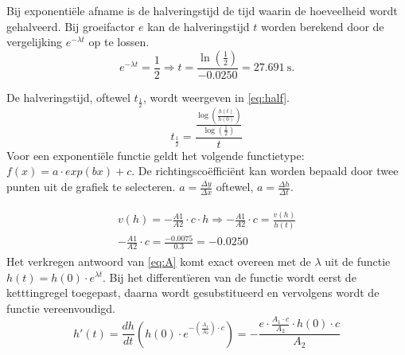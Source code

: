 \documentclass{scrartcl}
\begin{document}
Bij exponentiële afname is de halveringstijd de tijd waarin de hoeveelheid wordt gehalveerd. Bij groeifactor $e$ kan de halveringstijd $t$ worden berekend door de vergelijking $e^{-\lambda t}$ op te lossen.
\begin{equation}
e^{-\lambda t} = \frac{1}{2} \Rightarrow t =\frac{\ln(\frac{1}{2})}{-0.0250} = \SI{27.691}{\second}.
\end{equation}



De halveringstijd, oftewel $t_{\frac{1}{2}}$, wordt weergeven in \ref{eq:half}.
\begin{equation}\label{eq:half}
 t_{\frac{1}{2}}=\frac{\frac{\log\left(\frac{h(t)}{h(0)}\right)}{\log(\frac{1}{2})}}{t}
\end{equation}
Voor een exponentiële functie geldt het volgende functietype: $f(x) = a \cdot exp(bx)+c$. De richtingscoëfficiënt kan worden bepaald door twee punten uit de grafiek te selecteren. $a=\frac{\Delta y}{\Delta x}$ oftewel, $a=\frac{\Delta h}{\Delta t}$.  

\begin{align}\label{eq:A}
\begin{split}
v(h) = -\frac{A1}{A2} \cdot c \cdot h \Rightarrow -\frac{A1}{A2} \cdot c =\frac{v(h)}{h(t)}\\
-\frac{A1}{A2} \cdot c = \frac{-0.0075}{0.3} = -0.0250
\end{split}
\end{align}
Het verkregen antwoord van \ref{eq:A} komt exact overeen met de $\lambda$ uit de functie $h(t) = h(0)\cdot e^{\lambda t}$.
\newpage
Bij het differentïeren van de functie wordt eerst de ketttingregel toegepast, daarna wordt gesubstitueerd en vervolgens wordt de functie vereenvoudigd. 
\begin{equation}
    h'(t) = \frac{dh}{dt}\left(h(0)\cdot e^{-\left(\frac{A_1}{A_2}\right) \cdot c}\right)=-\frac{e \cdot \frac{A_1 \cdot c}{A_2} \cdot h(0) \cdot c }{A_2}
\end{equation}

\end{document}
